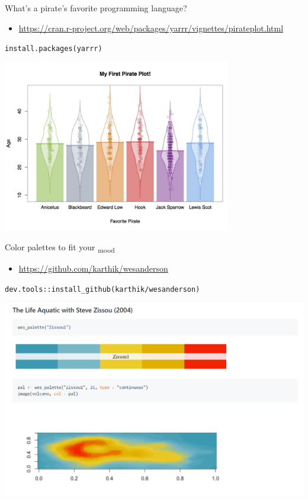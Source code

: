 \documentclass[
  ignorenonframetext,
]{beamer}
\providecommand{\tightlist}{%
  \setlength{\itemsep}{0pt}\setlength{\parskip}{0pt}}
\begin{document}
\begin{frame}[fragile]{What's a pirate's favorite programming language?}
\protect\hypertarget{whats-a-pirates-favorite-programming-language}{}

\begin{itemize}
\tightlist
\item
  \url{https://cran.r-project.org/web/packages/yarrr/vignettes/pirateplot.html}
\end{itemize}

\texttt{install.packages(\textquotesingle{}yarrr\textquotesingle{})}

\includegraphics[width=0.75\textwidth,height=\textheight]{../external/images/funR_2_pirate.png}

\end{frame}

\begin{frame}[fragile]{Color palettes to fit your \textsubscript{mood}}
\protect\hypertarget{color-palettes-to-fit-your-mood}{}

\begin{itemize}
\tightlist
\item
  \url{https://github.com/karthik/wesanderson}
\end{itemize}

\texttt{dev.tools::install\_github(karthik/wesanderson)}

\includegraphics{../external/images/funR_3_wes_anderson.png}

\end{frame}
\end{document}
